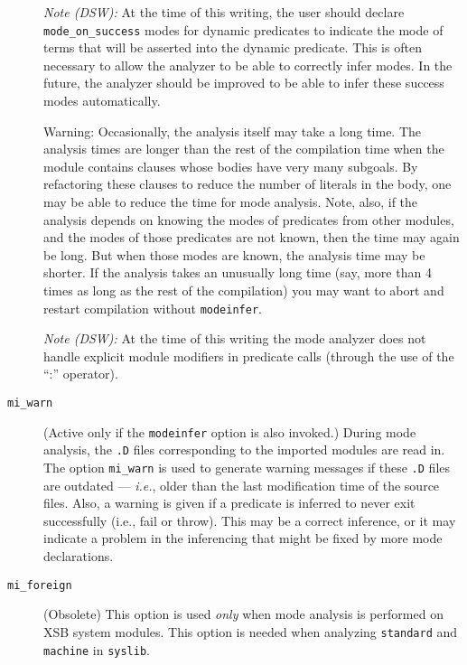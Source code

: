 \begin{description}
        {\em Note (DSW):} At the time of this writing, the user should
        declare {\tt mode\_on\_success} modes for dynamic predicates
        to indicate the mode of terms that will be asserted into the
        dynamic predicate.  This is often necessary to allow the
        analyzer to be able to correctly infer modes.  In the future,
        the analyzer should be improved to be able to infer these
        success modes automatically.

	{\sc Warning:} Occasionally, the analysis itself may take a
        long time.  The analysis times are longer than the rest of the
        compilation time when the module contains clauses whose bodies
        have very many subgoals.  By refactoring these clauses to
        reduce the number of literals in the body, one may be able to
        reduce the time for mode analysis.  Note, also, if the
        analysis depends on knowing the modes of predicates from other
        modules, and the modes of those predicates are not known, then
        the time may again be long.  But when those modes are known,
        the analysis time may be shorter.  If the analysis takes an
        unusually long time (say, more than 4 times as long as the
        rest of the compilation) you may want to abort and restart
        compilation without {\tt modeinfer}.

        {\em Note (DSW):} At the time of this writing the mode
        analyzer does not handle explicit module modifiers in
        predicate calls (through the use of the ``:'' operator).

\item[{\tt mi\_warn}]
  (Active only if the {\tt modeinfer} option is also invoked.)  During
  mode analysis, the {\tt .D} files corresponding to the imported
  modules are read in. The option {\tt mi\_warn} is used to generate
  warning messages if these {\tt .D} files are outdated --- {\em
    i.e.}, older than the last modification time of the source files.
  Also, a warning is given if a predicate is inferred to never exit
  successfully (i.e., fail or throw).  This may be a correct
  inference, or it may indicate a problem in the inferencing that
  might be fixed by more mode declarations.

\item[{\tt mi\_foreign}] (Obsolete) This option is used {\em only\/} when mode analysis
	is performed on XSB system modules. This option is
	needed when analyzing {\tt standard} and {\tt machine} in
	{\tt syslib}.



\end{description}
